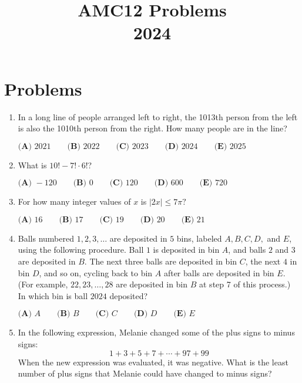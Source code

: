 \documentclass{article}
\title{AMC12 Problems \\ 2024}
\date{}
\begin{document}
\maketitle\thispagestyle{fancy}\newpage\section*{Problems}\begin{enumerate}[label=\arabic*., itemsep=0.5em]\item In a long line of people arranged left to right, the 1013th person from the left is also the 1010th person from the right. How many people are in the line?

$\textbf{(A) } 2021 \qquad\textbf{(B) } 2022 \qquad\textbf{(C) } 2023 \qquad\textbf{(D) } 2024 \qquad\textbf{(E) } 2025$\par \vspace{0.5em}\item What is $10! - 7! \cdot 6!$?

$\textbf{(A) }-120 \qquad\textbf{(B) }0 \qquad\textbf{(C) }120 \qquad\textbf{(D) }600 \qquad\textbf{(E) }720 \qquad$\par \vspace{0.5em}\item For how many integer values of $x$ is $|2x|\leq 7\pi?$

$\textbf{(A) }16 \qquad\textbf{(B) }17\qquad\textbf{(C) }19\qquad\textbf{(D) }20\qquad\textbf{(E) }21$\par \vspace{0.5em}\item Balls numbered $1,2,3,\ldots$ are deposited in $5$ bins, labeled $A,B,C,D,$ and $E$, using the following procedure. Ball $1$ is deposited in bin $A$, and balls $2$ and $3$ are deposited in $B$. The next three balls are deposited in bin $C$, the next $4$ in bin $D$, and so on, cycling back to bin $A$ after balls are deposited in bin $E$. (For example, $22,23,\ldots,28$ are deposited in bin $B$ at step 7 of this process.) In which bin is ball $2024$ deposited?

$\textbf{(A) }A\qquad\textbf{(B) }B\qquad\textbf{(C) }C\qquad\textbf{(D) }D\qquad\textbf{(E) }E$\par \vspace{0.5em}\item In the following expression, Melanie changed some of the plus signs to minus signs:
\begin{equation*}
1 + 3+5+7+\cdots+97+99
\end{equation*}
When the new expression was evaluated, it was negative. What is the least number of plus signs that Melanie could have changed to minus signs?


\end{enumerate}
\end{document}
